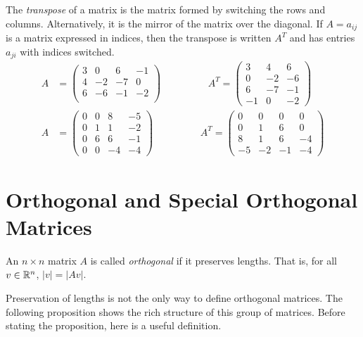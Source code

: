 \documentclass[fleqn]{report}
\begin{document}
\begin{defn}
The \emph{transpose} of a matrix is the matrix formed by
switching the rows and columns. Alternatively, it is the mirror
of the matrix over the diagonal. If $A = a_{ij}$ is a matrix expressed
in indices, then the transpose is written $A^T$ and has entries
$a_{ji}$ with indices switched. 
\begin{align*}
A & = 
\left(
\begin{matrix}
3 & 0 & 6 & -1 \\
4 & -2 & -7 & 0 \\
6 & -6 & -1 & -2 \\
\end{matrix}
\right)
\hspace{2cm}
A^T = 
\left(
\begin{matrix}
3 & 4 & 6 \\
0 & -2 & -6 \\
6 & -7 & -1 \\
-1 & 0 & -2
\end{matrix}
\right)
\\
A & = 
\left(
\begin{matrix}
0 & 0 & 8 & -5 \\
0 & 1 & 1 & -2 \\
0 & 6 & 6 & -1 \\
0 & 0 & -4 & -4 
\end{matrix}
\right)
\hspace{2cm}
A^T = 
\left(
\begin{matrix}
0 & 0 & 0 & 0 \\
0 & 1 & 6 & 0 \\
8 & 1 & 6 & -4 \\
-5 & -2 & -1 & -4
\end{matrix}
\right)
\end{align*}
\end{defn}
\section{Orthogonal and Special Orthogonal Matrices}

\begin{defn}
An $n \times n$ matrix $A$ is called \emph{orthogonal} if it
preserves lengths. That is, for all $v \in \mathbb{R}^n$, $|v| =
|Av|$. 
\end{defn}

Preservation of lengths is not the only way to define
orthogonal matrices. The following proposition shows the rich
structure of this group of matrices. Before
stating the proposition, here is a useful definition.
\end{document}
